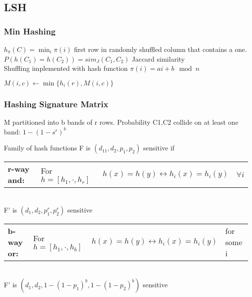 \documentclass[7pt,parskip]{scrartcl}
\begin{document}
\begin{multicols*}{3}
\subsection{LSH} %
\label{sub:lsh}
\subsubsection{Min Hashing} %
\label{ssub:min_hashing}
$h_\pi(C) = \min_i \pi(i)$ first row in randomly shuffled column that contains a one. \\
$P(h(C_1)=h(C_2)) = sim_J(C_1,C_2)$ Jaccard similarity \\
Shuffling implemented with hash function $\pi(i) = a i + b \mod n$ 
\begin{mdframed}
	\begin{algorithmic}
						 \State $M(i,c) \gets \min  \{ h_i(r),M(i,c) \} $
					\EndFor
				\EndIf
			\EndFor
		\EndFor
	\end{algorithmic}
\end{mdframed}
\subsubsection{Hashing Signature Matrix} %
\label{ssub:hashing_signature_matrix}
	M partitioned into b bands of r rows.  Probability C1,C2 collide on at least one band: $1-(1-s^r)^b$
	
	Family of hash functions F is $(d_11,d_2,p_1,p_2)$ sensitive if
	\tabcolsep=0.11cm\begin{tabular}{l l l l}
		\textbf{r-way and:} & For $h=[h_1,\cdot,h_r]$ & $h(x)=h(y) \leftrightarrow h_i(x)=h_i(y)$ & $\forall i$
	\end{tabular} \\
	F' is $(d_1,d_2,p_1^r,p_2^r)$ sensitive
	
	\tabcolsep=0.11cm\begin{tabular}{l l l l}
		\textbf{b-way or:} & For $h=[h_1,\cdot,h_b]$  & $h(x)=h(y) \leftrightarrow h_i(x)=h_i(y)$ & for some i
	\end{tabular} \\
	F' is $(d_1,d_2,1-(1-p_1)^b,1-(1-p_2)^b)$ sensitive

\end{multicols*}
\end{document}
